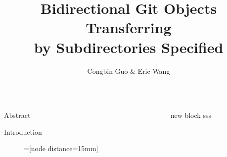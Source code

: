 \documentclass[final]{beamer}
\title{Bidirectional Git Objects Transferring\\ by Subdirectories Specified}
\author{Congbin Guo \& Eric Wang}
\institute{VMware Inc.}
\begin{document}
\begin{frame}[t]
  \begin{columns}[t]
    \begin{column}{.5\linewidth}
      \begin{block}{Abstract}
        
      \end{block}
      \begin{block}{Introduction}
        \begin{figure}[htpb]
          =[node distance=15mm]
          \centering
        \end{figure}
      \end{block}
    \end{column}
    \begin{column}{.5\linewidth}
      \begin{block}{new block}
        sss
      \end{block}
    \end{column}
  \end{columns}
\end{frame}
\end{document}
